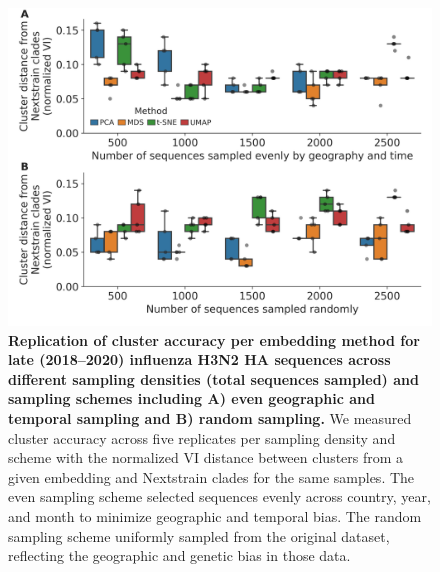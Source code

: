 \begin{figure}[!h]
\includegraphics[width=\columnwidth]{figures/flu-2018-2020-replication-of-cluster-accuracy.png}
\caption{{\bf Replication of cluster accuracy per embedding method for late (2018--2020) influenza H3N2 HA sequences across different sampling densities (total sequences sampled) and sampling schemes including A) even geographic and temporal sampling and B) random sampling.}
  We measured cluster accuracy across five replicates per sampling density and scheme with the normalized VI distance between clusters from a given embedding and Nextstrain clades for the same samples.
  The even sampling scheme selected sequences evenly across country, year, and month to minimize geographic and temporal bias.
  The random sampling scheme uniformly sampled from the original dataset, reflecting the geographic and genetic bias in those data.}\label{S_Fig_late_flu_replication_of_cluster_accuracy}
\end{figure}

